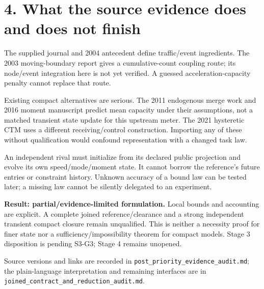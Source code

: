 \documentclass[11pt,a4paper]{article}
\begin{document}
\section*{4. What the source evidence does and does not finish}
The supplied journal and 2004 antecedent define traffic/event ingredients.
The 2003 moving-boundary report gives a cumulative-count coupling route; its
node/event integration here is not yet verified. A guessed acceleration-capacity
penalty cannot replace that route.

Existing compact alternatives are serious. The 2011 endogenous merge work and
2016 moment manuscript predict mean capacity under their assumptions, not a
matched transient state update for this upstream meter. The 2021 hysteretic CTM
uses a different receiving/control construction. Importing any of these without
qualification would confound representation with a changed task law.

An independent rival must initialize from its declared public projection and
evolve its own speed/mode/moment state. It cannot borrow the reference's future
entries or constraint history. Unknown accuracy of a bound law can be tested
later; a missing law cannot be silently delegated to an experiment.

\textbf{Result: partial/evidence-limited formulation.} Local bounds and accounting
are explicit. A complete joined reference/clearance and a strong independent
transient compact closure remain unqualified. This is neither a necessity proof
for finer state nor a sufficiency/impossibility theorem for compact models.
Stage 3 disposition is pending S3-G3; Stage 4 remains unopened.

Source versions and links are recorded in
\texttt{post\_priority\_evidence\_audit.md}; the plain-language interpretation
and remaining interfaces are in
\texttt{joined\_contract\_and\_reduction\_audit.md}.
\end{document}
